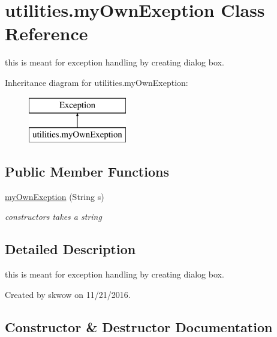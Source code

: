 \hypertarget{classutilities_1_1my_own_exeption}{}\section{utilities.\+my\+Own\+Exeption Class Reference}
\label{classutilities_1_1my_own_exeption}


this is meant for exception handling by creating dialog box.  


Inheritance diagram for utilities.\+my\+Own\+Exeption\+:\begin{figure}[H]
\begin{center}
\leavevmode
\includegraphics[height=2.000000cm]{classutilities_1_1my_own_exeption}
\end{center}
\end{figure}
\subsection*{Public Member Functions}
\begin{DoxyCompactItemize}
\item 
\hyperlink{classutilities_1_1my_own_exeption_a06cbd6448612ea5d4067e4b2a47acd09}{my\+Own\+Exeption} (String s)
\begin{DoxyCompactList}\small\item\em constructors takes a string \end{DoxyCompactList}\end{DoxyCompactItemize}


\subsection{Detailed Description}
this is meant for exception handling by creating dialog box. 

Created by skwow on 11/21/2016. 

\subsection{Constructor \& Destructor Documentation}
\hypertarget{classutilities_1_1my_own_exeption_a06cbd6448612ea5d4067e4b2a47acd09}{}\label{classutilities_1_1my_own_exeption_a06cbd6448612ea5d4067e4b2a47acd09} 
